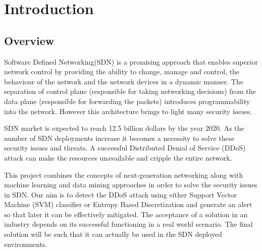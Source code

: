 \documentclass[12pt,a4paper,final]{report}
\begin{document}
\chapter{Introduction}
\thispagestyle{empty}
\newpage
\section{Overview}
Software Defined Networking(SDN) is a promising approach that enables superior network control by providing the ability to change, manage and control, the behaviour of the network and the network devices in a dynamic manner. The separation of control plane (responsible for taking networking decisions) from the data plane (responsible for forwarding the packets) introduces programmability into the network. However this architecture brings to light many security issues.

SDN market is expected to reach 12.5 billion dollars by the year 2020. As the number of SDN deployments increase it becomes a necessity to solve these security issues and threats. A successful Distributed Denial of Service (DDoS) attack can make the resources unavailable and cripple the entire network.

This project combines the concepts of next-generation networking along with machine learning and data mining approaches in order to solve the security issues in SDN. Our aim is to detect the DDoS attack using either Support Vector Machine (SVM) classifier or Entropy Based Discretization and generate an alert so that later it can be effectively mitigated. The acceptance of a solution in an industry depends on its successful functioning in a real world scenario. The final solution will be such that it can actually be used in the SDN deployed environments. 
\end{document}
